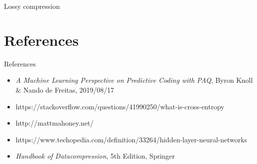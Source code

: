 \documentclass[11pt,usenames,dvipsnames]{beamer}
\begin{document}
\begin{frame}{Lossy compression}


\end{frame}

\section{References}

\begin{frame}{References}

\begin{itemize}
	\item \textit{A Machine Learning Perspective on Predictive Coding with PAQ}, Byron Knoll \& Nando de Freitas,
	2019/08/17
	\item https://stackoverflow.com/questions/41990250/what-is-cross-entropy
	\item http://mattmahoney.net/
	\item https://www.techopedia.com/definition/33264/hidden-layer-neural-networks
	\item \textit{Handbook of Datacompression}, 5th Edition, Springer
\end{itemize}

\end{frame}
\end{document}
